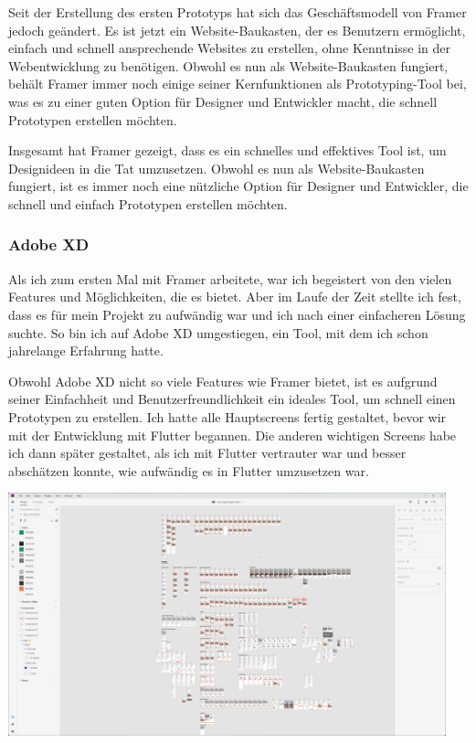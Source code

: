 Seit der Erstellung des ersten Prototyps hat sich das Geschäftsmodell von Framer jedoch geändert. Es ist jetzt ein Website-Baukasten, der es Benutzern ermöglicht, einfach und schnell ansprechende Websites zu erstellen, ohne Kenntnisse in der Webentwicklung zu benötigen. Obwohl es nun als Website-Baukasten fungiert, behält Framer immer noch einige seiner Kernfunktionen als Prototyping-Tool bei, was es zu einer guten Option für Designer und Entwickler macht, die schnell Prototypen erstellen möchten.

Insgesamt hat Framer gezeigt, dass es ein schnelles und effektives Tool ist, um Designideen in die Tat umzusetzen. Obwohl es nun als Website-Baukasten fungiert, ist es immer noch eine nützliche Option für Designer und Entwickler, die schnell und einfach Prototypen erstellen möchten.

\subsubsection{Adobe XD}
Als ich zum ersten Mal mit Framer arbeitete, war ich begeistert von den vielen Features und Möglichkeiten, die es bietet. Aber im Laufe der Zeit stellte ich fest, dass es für mein Projekt zu aufwändig war und ich nach einer einfacheren Lösung suchte. So bin ich auf Adobe XD umgestiegen, ein Tool, mit dem ich schon jahrelange Erfahrung hatte.

Obwohl Adobe XD nicht so viele Features wie Framer bietet,
ist es aufgrund seiner Einfachheit und
Benutzerfreundlichkeit ein ideales Tool, um schnell einen
Prototypen zu erstellen. Ich hatte alle Hauptscreens
fertig gestaltet, bevor wir mit der Entwicklung mit Flutter
begannen. Die anderen wichtigen Screens habe ich dann
später gestaltet, als ich mit Flutter vertrauter war und
besser abschätzen konnte, wie aufwändig es in Flutter
umzusetzen war.

\includegraphics[width=0.95\textwidth]{pics/nochba-adobe-xd-protoype-screenshot.png}


